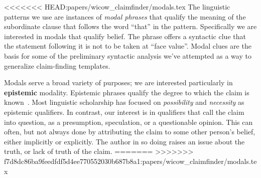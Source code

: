 
<<<<<<< HEAD:papers/wicow_claimfinder/modals.tex
The linguistic patterns we use are instances of {\it modal phrases} that qualify the meaning of the subordinate clause that follows the word ``that'' in the pattern. Specifically we are interested in
modals that qualify belief.  The phrase offers a syntactic clue that the statement following it
is not to be taken at ``face value''.  Modal clues are the basis for some of the preliminary syntactic analysis
we've attempted as a way to generalize claim-finding templates. 

Modals serve a broad variety of purposes;
we are interested particularly in  {\bf epistemic} modality. Epistemic phrases qualify the
degree to which the claim is known~\cite{Palmer.2001}. Most linguistic scholarship has focused on {\it
possibility} and {\it necessity} as epistemic qualifiers. In
contrast, our interest is in qualifiers that call the claim into
question, as a presumption, speculation, or a questionable
opinion. This can often, but not always done by attributing the claim
to some other person's belief, either implicitly or explicitly. The
author in so doing raises an issue about the truth, or lack of truth
of the claim.
=======
>>>>>>> f7d8dc86ba9feedfdf5d4ee770552030b687b8a1:papers/wicow_claimfinder/modals.tex
